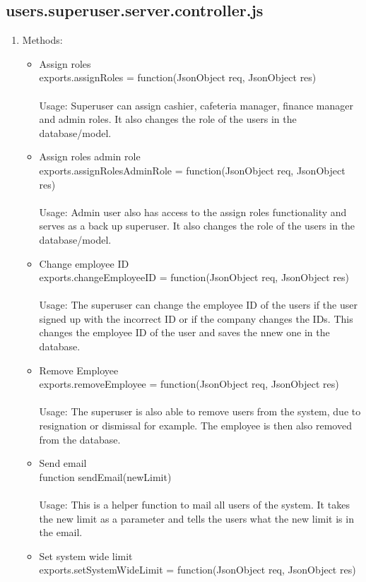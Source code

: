 \documentclass[a4paper,12pt]{report}
\begin{document}
\subsection{users.superuser.server.controller.js}
\begin{enumerate}
\item Methods:
	\begin{itemize}
		\item Assign roles \\ exports.assignRoles = function(JsonObject req, JsonObject res) 
		\\ \\ Usage: Superuser can assign cashier, cafeteria manager, finance manager and admin roles. It also changes the role of the users in the database/model. 
		\item Assign roles admin role \\ exports.assignRolesAdminRole = function(JsonObject req, JsonObject res) 
		\\ \\ Usage: Admin user also has access to the assign roles functionality and serves as a back up superuser. It also changes the role of the users in the database/model.
		\item Change employee ID \\ exports.changeEmployeeID = function(JsonObject req, JsonObject res)  
		\\ \\ Usage: The superuser can change the employee ID of the users if the user signed up with the incorrect ID or if the company changes the IDs. This changes the employee ID of the user and saves the nnew one in the database.
		\item Remove Employee \\ exports.removeEmployee = function(JsonObject req, JsonObject res)  
		\\ \\ Usage: The superuser is also able to remove users from the system, due to resignation or dismissal for example. The employee is then also removed from the database.	
		\item Send email \\ function sendEmail(newLimit)  
		\\ \\ Usage: This is a helper function to mail all users of the system. It takes the new limit as a parameter and tells the users what the new limit is in the email.
		\item Set system wide limit \\ exports.setSystemWideLimit = function(JsonObject req, JsonObject res) 

\end{itemize}
\end{enumerate}
\end{document}
